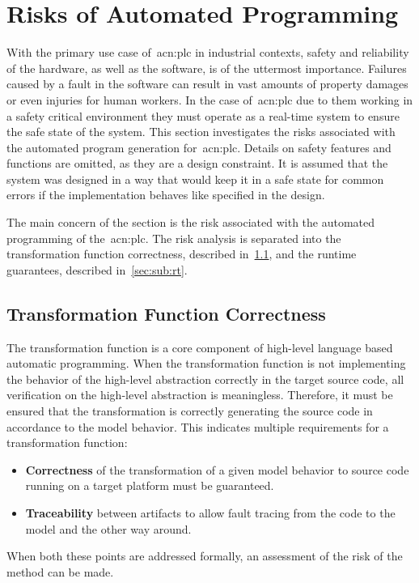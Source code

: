 \section{Risks of Automated Programming}
\label{sec:risks}

With the primary use case of~\acrshort{acn:plc} in industrial contexts, safety and reliability of the hardware, as well as the software, is of the uttermost importance.
Failures caused by a fault in the software can result in vast amounts of property damages or even injuries for human workers.
In the case of~\acrshort{acn:plc} due to them working in a safety critical environment they must operate as a real-time system to ensure the safe state of the system.
This section investigates the risks associated with the automated program generation for~\acrshort{acn:plc}.
Details on safety features and functions are omitted, as they are a design constraint.
It is assumed that the system was designed in a way that would keep it in a safe state for common errors if the implementation behaves like specified in the design.

The main concern of the section is the risk associated with the automated programming of the~\acrshort{acn:plc}.
The risk analysis is separated into the transformation function correctness, described in~\ref{sec:sub:trans}, and the runtime guarantees, described in~\ref{sec:sub:rt}. 
\subsection{Transformation Function Correctness}
\label{sec:sub:trans}
The transformation function is a core component of high-level language based automatic programming.
When the transformation function is not implementing the behavior of the high-level abstraction correctly in the target source code, all verification on the high-level abstraction is meaningless.
Therefore, it must be ensured that the transformation is correctly generating the source code in accordance to the model behavior.
This indicates multiple requirements for a transformation function:
\begin{itemize}
	\item \textbf{Correctness} of the transformation of a given model behavior to source code running on a target platform must be guaranteed.
	\item \textbf{Traceability} between artifacts to allow fault tracing from the code to the model and the other way around. 
\end{itemize}
When both these points are addressed formally, an assessment of the risk of the method can be made.

